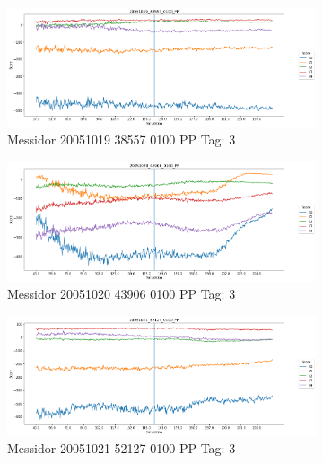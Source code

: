 \begin{figure}[ht!]
	\centering
	\begin{subfigure}[b]{ 0.85\textwidth}
		\centering
		\includegraphics[width=\textwidth]{Figures/chapter_stability/20051019_38557_0100_PP/s/scores.png}
		\caption{Messidor 20051019 38557 0100 PP Tag: 3}				
	\end{subfigure}	
	\begin{subfigure}[b]{ 0.85\textwidth}
		\centering
		\includegraphics[width=\textwidth]{Figures/chapter_stability/20051020_43906_0100_PP/s/scores.png}
		\caption{Messidor 20051020 43906 0100 PP Tag: 3}				
	\end{subfigure}	
	\begin{subfigure}[b]{ 0.85\textwidth}
		\centering
		\includegraphics[width=\textwidth]{Figures/chapter_stability/20051021_52127_0100_PP/s/scores.png}
		\caption{Messidor 20051021 52127 0100 PP Tag: 3}				
	\end{subfigure}	
	\begin{subfigure}[b]{ 0.85\textwidth}

\end{subfigure}
\end{figure}
